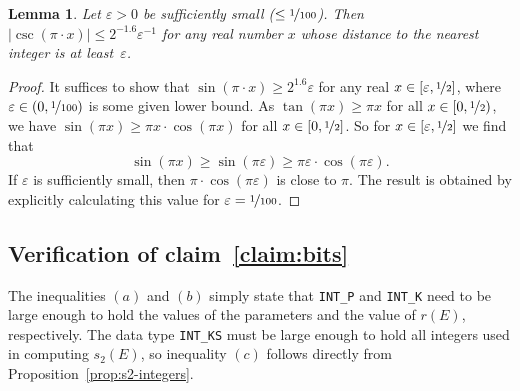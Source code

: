 \documentclass{article}
\newtheorem{lem}{Lemma}
\newcommand{\abs}[1]{\left|#1\right|}
\begin{document}
\begin{lem}\label{lem:csc}
  Let \(\varepsilon>0\) be sufficiently small (\(\leq \nicefrac{1}{100}\)).  Then
  \(\abs{\csc(\pi·x)} \leq 2^{-1.6} \varepsilon^{-1}\) for any real number \(x\) whose distance to the nearest integer is at least~\(\varepsilon\).
\end{lem}
\begin{proof}
  It suffices to show that \(\sin(\pi·x) \geq 2^{1.6} \varepsilon\) for any real \(x\in [\varepsilon,\nicefrac{1}{2}]\), where \(\varepsilon \in (0,\nicefrac{1}{100})\) is some given lower bound.  As \(\tan(\pi x) \geq \pi x\) for all \(x\in [0,\nicefrac{1}{2})\), we have \(\sin(\pi x) \geq \pi x·\cos(\pi x)\) for all \(x\in [0,\nicefrac{1}{2}]\).  So for \(x\in [\varepsilon,\nicefrac{1}{2}]\) we find that 
  \[
    \sin(\pi x) \geq \sin(\pi\varepsilon) \geq \pi\varepsilon·\cos(\pi\varepsilon).
  \]
  If \(\varepsilon\) is sufficiently small, then \(\pi·\cos(\pi\varepsilon)\) is close to \(\pi\).
  The result is obtained by explicitly calculating this value for \(\varepsilon = \nicefrac{1}{100}\).
%
%
\end{proof}

\subsection*{Verification of claim~\ref{claim:bits}}
The inequalities \((a)\) and \((b)\) simply state that \verb+INT_P+ and \verb+INT_K+ need to be large enough to hold the values of the parameters and the value of \(r(E)\), respectively.  The data type \verb+INT_KS+ must be large enough to hold all integers used in computing \(s_2(E)\), so inequality \((c)\) follows directly from Proposition~\ref{prop:s2-integers}.  
\end{document}
